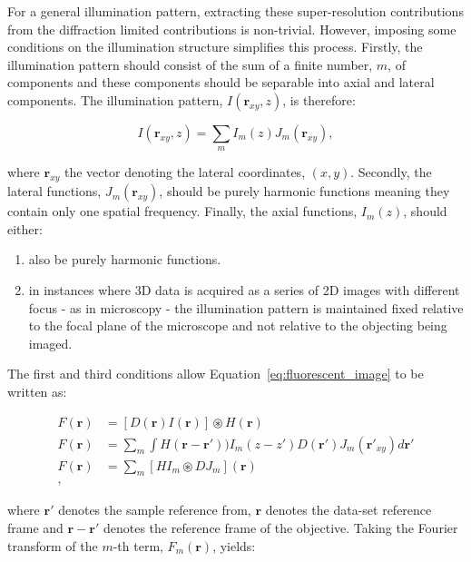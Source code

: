 For a general illumination pattern, extracting these super-resolution 
contributions from the diffraction limited contributions is non-trivial.
However, imposing some conditions on the illumination structure simplifies
this process\cite{gustafsson2008three}. Firstly, the illumination pattern 
should consist of the sum of a finite number, $m$, of components and these
components should be separable into axial and lateral components. The 
illumination pattern, $I(\textbf{r}_{xy},z)$, is therefore:

\begin{equation}\label{eq:illumination_components}
I(\textbf{r}_{xy},z) = \sum\limits_{m}{I_{m}(z)J_{m}(\textbf{r}_{xy})},
\end{equation}

where $\textbf{r}_{xy}$ the vector denoting the lateral coordinates, $(x,y)$.
Secondly, the lateral functions, $J_{m}(\textbf{r}_{xy})$, should be purely
harmonic functions meaning they contain only one spatial frequency. Finally, 
the axial functions, $I_{m}(z)$, should either: 

\begin{enumerate}
	\item also be purely harmonic functions.
	\item in instances where 3D data is acquired as a series of 2D images with 
	different focus - as in microscopy - the illumination pattern is maintained 
	fixed relative to the focal plane of the microscope and not relative to the
	objecting being imaged.
\end{enumerate}

The first and third conditions allow Equation~\ref{eq:fluorescent_image} to be
written as:

\begin{equation}\label{eq:fluorescent_image_conditions}
\begin{split}
F(\textbf{r}) &= [D(\textbf{r})I(\textbf{r})] \circledast H(\textbf{r})\\
F(\textbf{r}) &= \sum\limits_{m}{\int H(\textbf{r}-\textbf{r}'))I_{m}(z - z')D(\textbf{r}')J_{m}(\textbf{r}'_{xy})}d\textbf{r}'\\
F(\textbf{r}) &= \sum\limits_{m}{\left[HI_{m}\circledast DJ_{m}\right](\textbf{r})}\\,
\end{split}
\end{equation}

where $\textbf{r}'$ denotes the sample reference from, $\textbf{r}$ denotes
the data-set reference frame and $\textbf{r} - \textbf{r}'$ denotes the 
reference frame of the objective. Taking the Fourier transform of the 
$m$-th term, $F_{m}(\textbf{r})$, yields:

